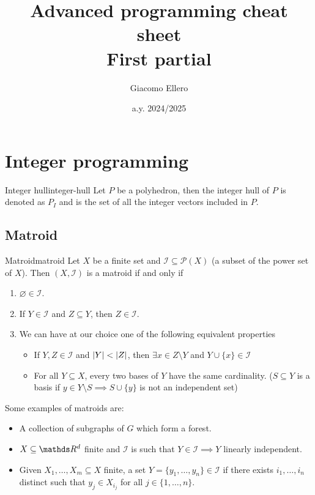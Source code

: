 \documentclass[12pt]{extarticle}
\title{Advanced programming cheat sheet\\First partial}
\author{Giacomo Ellero}
\date{a.y. 2024/2025}
\numberwithin{equation}{subsection}
\begin{document}
\oldfirstpage

\section{Integer programming}

\begin{definition}{Integer hull}{integer-hull}
	Let $P$ be a polyhedron, then the integer hull of $P$ is denoted as $P_I$ and is the set of all
	the integer vectors included in $P$.
\end{definition}

\subsection{Matroid}

\begin{definition}{Matroid}{matroid}
	Let $X$ be a finite set and $\mathcal I \subseteq \mathcal P(X)$ (a subset of the power set of
	$X$). Then $(X, \mathcal I)$ is a matroid if and only if
	\begin{enumerate}
		\item $\varnothing \in \mathcal I$.
		\item If $Y \in \mathcal I$ and $Z \subseteq Y$, then $Z \in \mathcal I$.
		\item We can have at our choice one of the following equivalent properties
		      \begin{itemize}
			      \item If $Y, Z \in \mathcal I$ and $\abs{Y} < \abs{Z}$, then
			            $\exists x \in Z \setminus Y$ and $Y \cup \{x\} \in \mathcal I$
			      \item For all $Y \subseteq X$, every two bases of $Y$ have the same cardinality.
			            ($S \subseteq Y$ is a basis if $y \in Y \setminus S \implies S \cup \{y\}$ is not
			            an independent set)
		      \end{itemize}
	\end{enumerate}
\end{definition}

Some examples of matroids are:
\begin{itemize}
	\item A collection of subgraphs of $G$ which form a forest.
	\item $X \subseteq \R^d$ finite and $\mathcal I$ is such that $Y \in \mathcal I \implies Y$
	      linearly independent.
	\item Given $X_1, \dots, X_m \subseteq X$ finite, a set $Y = \{y_1, \dots, y_n \} \in \mathcal I$
	      if there exists $i_1, \dots, i_n$ distinct such that $y_j \in X_{i_j}$ for all
	      $j \in \{1, \dots, n\}$.
\end{itemize}
\end{document}
